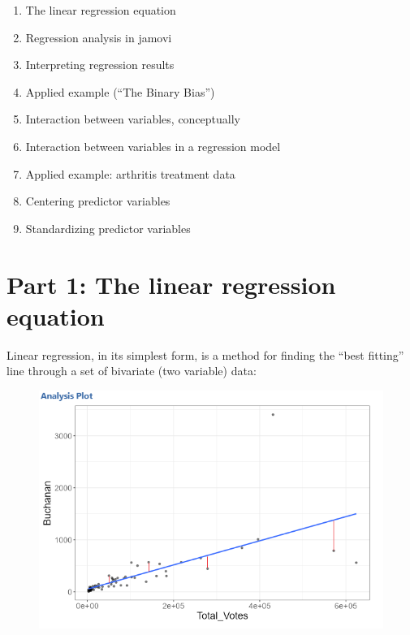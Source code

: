 \documentclass[
  letterpaper,
  DIV=11,
  numbers=noendperiod]{scrreprt}
\providecommand{\tightlist}{%
  \setlength{\itemsep}{0pt}\setlength{\parskip}{0pt}}\usepackage{longtable,booktabs,array}
\begin{document}
\begin{enumerate}
\def\labelenumi{\arabic{enumi}.}
\tightlist
\item
  The linear regression equation
\item
  Regression analysis in jamovi
\item
  Interpreting regression results
\item
  Applied example (``The Binary Bias'')
\item
  Interaction between variables, conceptually
\item
  Interaction between variables in a regression model
\item
  Applied example: arthritis treatment data
\item
  Centering predictor variables
\item
  Standardizing predictor variables
\end{enumerate}

\hypertarget{part-1-the-linear-regression-equation}{%
\section{Part 1: The linear regression
equation}\label{part-1-the-linear-regression-equation}}

Linear regression, in its simplest form, is a method for finding the
``best fitting'' line through a set of bivariate (two variable) data:

\begin{figure}

{\centering \includegraphics{images/mod2_pt1 (1).png}

}

\end{figure}
\end{document}
